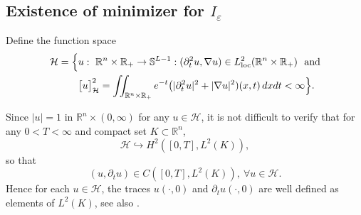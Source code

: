 \documentclass[12pt,twoside,reqno]{amsart}
\theoremstyle{definition}              %
\theoremstyle{remark}                  %
\newcommand{\R}{\mathbb{R}}                 %
\newcommand{\eps}{\varepsilon}
\renewcommand{\1}{\mathbbm{1}}                                      %
\numberwithin{equation}{section}
\numberwithin{definition}{section}
\numberwithin{theorem}{section}
\numberwithin{remark}{section}
\begin{document}
\subsection{Existence of minimizer for $I_\eps$} 
Define the function space
\begin{align*}
\mathcal{H}&=
\Big\{u:\ \mathbb R^n\times \R_+\to \mathbb{S}^{L-1}: (\partial_t^2u,\nabla u)\in L^2_{\rm{loc}}(\mathbb R^n\times \R_+)\ \ {\rm{and}} \\
&\qquad\big[u\big]_{\mathcal{H}}^2
=\iint_{\mathbb{R}^n\times\R_+}
e^{-t}\big(|\partial_t^2u|^2+|\nabla u|^2)(x,t)\,dxdt<\infty
\Big\}.
\end{align*}

Since $|u|=1$ in $\R^n\times (0,\infty)$ for any
$u\in \mathcal{H}$, it is not difficult to verify that for any 
$0<T<\infty$ and compact set $K\subset\mathbb{R}^n$,
$$
\mathcal{H}\hookrightarrow H^2([0,T], L^2(K)),
$$
so that 
$$
(u, \partial_tu)\in C([0, T], L^2(K)), \ \forall u\in \mathcal{H}.
$$
Hence for each $u\in \mathcal{H}$, the traces $u(\cdot, 0)$
and $\partial_t u(\cdot, 0)$ are  well defined as elements of $L^2(K)$, see also \cite[Remark 2.1]{Serra-Tilli2012}.
\end{document}
